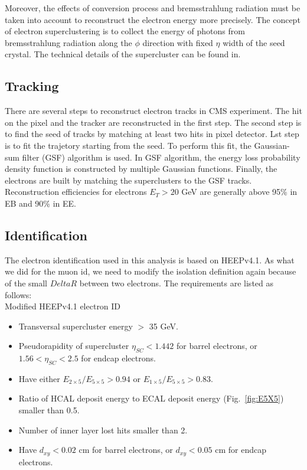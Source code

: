 Moreover, the effects of conversion process and bremsstrahlung radiation must be taken into account to reconstruct the electron energy more precisely. The concept of electron superclustering is to collect the energy of photons from bremsstrahlung radiation along the $\phi$ direction with fixed $\eta$ width of the seed crystal. The technical details of the supercluster can be found in\cite{eleSC}.

\subsection*{Tracking}
There are several steps to reconstruct electron tracks in CMS experiment. The hit on the pixel and the tracker are reconstructed in the first step. The second step is to find the seed of tracks by matching at least two hits in pixel detector. Lst step is to fit the trajetory starting from the seed. To perform this fit, the Gaussian-sum filter (GSF) algorithm is used\cite{GSF}. In GSF algorithm, the energy loss probability density function is constructed by multiple Gaussian functions. Finally, the electrons are built by matching the superclusters to the GSF tracks. Reconstruction efficiencies for electrons $E_{T} > 20$ GeV are generally above 95\% in EB and 90\% in EE\cite{eleRecoEff}.

\subsection*{Identification}
The electron identification used in this analysis is based on HEEPv4.1\cite{HEEP}. As what we did for the muon id, we need to modify the isolation definition again because of the small $DeltaR$ between two electrons. The requirements are listed as follows:\\

Modified HEEPv4.1 electron ID
\begin{itemize}
\item Transversal supercluster energy $>$ 35 GeV.
\item Pseudorapidity of supercluster $\eta_{SC} < 1.442$ for barrel electrons, or $1.56 < \eta_{SC} < 2.5$ for endcap electrons.
\item Have either $E_{2\times 5}/E_{5\times 5} > 0.94$ or $E_{1\times 5}/E_{5\times 5} > 0.83$.
\item Ratio of HCAL deposit energy to ECAL deposit energy (Fig.~\ref{fig:E5X5}) smaller than 0.5.
\item Number of inner layer lost hits smaller than 2.
\item Have $d_{xy} < 0.02$ cm for barrel electrons, or $d_{xy} < 0.05$ cm for endcap electrons.\\
\end{itemize}


